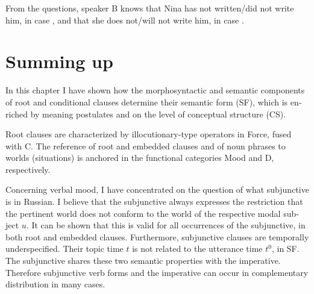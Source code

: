 \documentclass[output=paper,colorlinks,citecolor=brown]{langscibook}
\begin{document}
\begin{otherlanguage}{english}
\begin{exe}
\ex \label{ex:16:42}
\begin{xlist}
\end{xlist}
\end{exe}

\noindent From the questions, speaker B knows that Nina has not written/did not write him, in case , and that she does not/will not write him, in case .


\section{Summing up}

In this chapter I have shown how the morphosyntactic and semantic components of root and conditional clauses determine their semantic form (SF), which is enriched by meaning postulates and on the level of conceptual structure (CS).

Root clauses are characterized by illocutionary-type operators in Force, fused with C. The reference of root and embedded clauses and of noun phrases to worlds (situations) is anchored in the functional categories Mood and D, respectively.

Concerning verbal mood, I have concentrated on the question of what subjunctive is in Russian. I believe that the subjunctive always expresses the restriction that the pertinent world does not conform to the world of the respective modal subject $u$. It can be shown that this is valid for all occurrences of the subjunctive, in both root and embedded clauses. Furthermore, subjunctive clauses are temporally underspecified. Their topic time $t$ is not related to the utterance time $t^0$, in SF. The subjunctive shares these two semantic properties with the imperative. Therefore subjunctive verb forms and the imperative can occur in complementary distribution in many cases. 


\end{otherlanguage}
\end{document}
